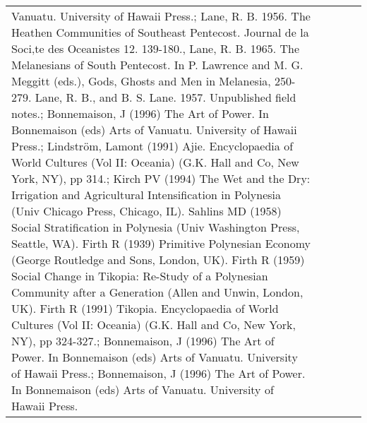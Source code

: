 \begin{longtable}{p{5cm}p{2cm}p{2cm}p{2cm}p{2cm}}
Vanuatu. University of Hawaii Press.; Lane, R. B. 1956. The Heathen Communities of Southeast Pentecost. Journal de la Soci‚te des Oceanistes 12. 139-180., Lane, R. B. 1965. The Melanesians of South Pentecost. In P. Lawrence and M. G. Meggitt (eds.), Gods, Ghosts and Men in Melanesia, 250-279. Lane, R. B., and B. S. Lane. 1957. Unpublished field notes.; Bonnemaison, J (1996) The Art of Power. In Bonnemaison (eds) Arts of Vanuatu. University of Hawaii Press.; Lindström, Lamont (1991) Ajie. Encyclopaedia of World Cultures (Vol II: Oceania) (G.K. Hall and Co, New York, NY), pp 314.; Kirch PV (1994) The Wet and the Dry: Irrigation and Agricultural Intensification in Polynesia (Univ Chicago Press, Chicago, IL). Sahlins MD (1958) Social Stratification in Polynesia (Univ Washington Press, Seattle, WA). Firth R (1939) Primitive Polynesian Economy (George Routledge and Sons, London, UK). Firth R (1959) Social Change in Tikopia: Re-Study of a Polynesian Community after a Generation (Allen and Unwin, London, UK). Firth R (1991) Tikopia. Encyclopaedia of World Cultures (Vol II: Oceania) (G.K. Hall and Co, New York, NY), pp 324-327.; Bonnemaison, J (1996) The Art of Power. In Bonnemaison (eds) Arts of Vanuatu. University of Hawaii Press.; Bonnemaison, J (1996) The Art of Power. In Bonnemaison (eds) Arts of Vanuatu. University of Hawaii Press. \\ 

\end{longtable}
